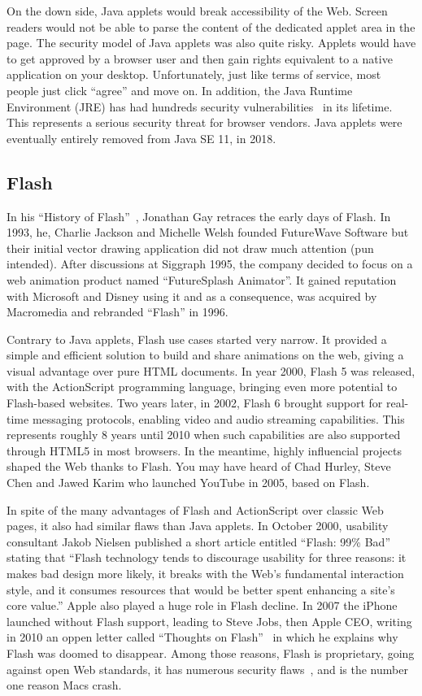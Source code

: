On the down side, Java applets would break accessibility of the Web.
Screen readers would not be able to parse the content of the dedicated
applet area in the page.
The security model of Java applets was also quite risky.
Applets would have to get approved by a browser user and then gain rights
equivalent to a native application on your desktop.
Unfortunately, just like terms of service, most people just click ``agree''
and move on.
In addition, the Java Runtime Environment (JRE) has had hundreds security
vulnerabilities~\cite{JreCve} in its lifetime.
This represents a serious security threat for browser vendors.
Java applets were eventually entirely removed from Java SE 11, in 2018.

\subsection{Flash}%
\label{sub:Flash}

In his ``History of Flash''~\cite{HistoryFlash}, Jonathan Gay retraces the early days of Flash.
In 1993, he, Charlie Jackson and Michelle Welsh founded FutureWave Software
but their initial vector drawing application did not draw much attention (pun intended).
After discussions at Siggraph 1995, the company decided to focus on a web animation
product named ``FutureSplash Animator''.
It gained reputation with Microsoft and Disney using it and as a consequence,
was acquired by Macromedia and rebranded ``Flash'' in 1996.

Contrary to Java applets, Flash use cases started very narrow.
It provided a simple and efficient solution to build and share animations on the web,
giving a visual advantage over pure HTML documents.
In year 2000, Flash 5 was released, with the ActionScript programming language,
bringing even more potential to Flash-based websites.
Two years later, in 2002, Flash 6 brought support for real-time messaging protocols,
enabling video and audio streaming capabilities.
This represents roughly 8 years until 2010 when such capabilities are also
supported through HTML5 in most browsers.
In the meantime, highly influencial projects shaped the Web thanks to Flash.
You may have heard of Chad Hurley, Steve Chen and Jawed Karim who launched
YouTube in 2005, based on Flash.

In spite of the many advantages of Flash and ActionScript over classic Web pages,
it also had similar flaws than Java applets.
In October 2000, usability consultant Jakob Nielsen published a short article
entitled ``Flash: 99\% Bad''~\cite{FlashBadNielsen} stating that
``Flash technology tends to discourage usability for three reasons:
it makes bad design more likely,
it breaks with the Web's fundamental interaction style,
and it consumes resources that would be better spent enhancing a site's core value.''
Apple also played a huge role in Flash decline.
In 2007 the iPhone launched without Flash support,
leading to Steve Jobs, then Apple CEO, writing in 2010 an oppen letter called
``Thoughts on Flash''~\cite{FlashJobs}
in which he explains why Flash was doomed to disappear.
Among those reasons, Flash is proprietary, going against open Web standards,
it has numerous security flaws~\cite{FlashCVE}, and is the number one reason Macs crash.

